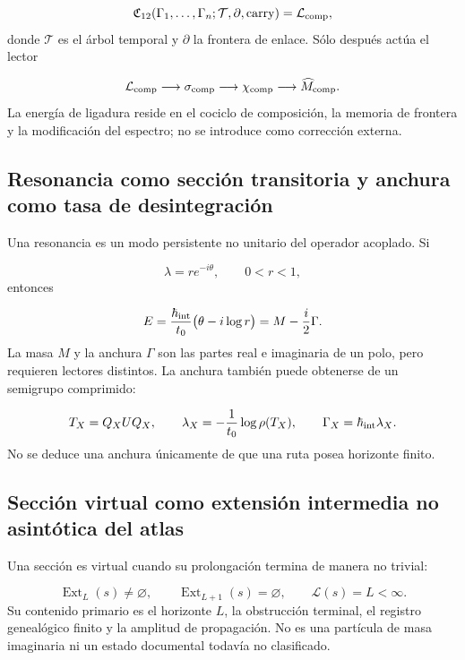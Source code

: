 \[
 \mathfrak C_{12}
 (\Gamma_1,\ldots,\Gamma_n;\mathcal T,\partial,\mathrm{carry})
 =\mathcal L_{\rm comp},
\]
donde \(\mathcal T\) es el árbol temporal y \(\partial\) la frontera de enlace. Sólo después actúa el lector

\[
 \mathcal L_{\rm comp}\longrightarrow\sigma_{\rm comp}
 \longrightarrow\chi_{\rm comp}
 \longrightarrow\widehat M_{\rm comp}.
\]
La energía de ligadura reside en el cociclo de composición, la memoria de frontera y la modificación del espectro; no se introduce como corrección externa.

\subsection{Resonancia como sección transitoria y anchura como tasa de desintegración}
Una resonancia es un modo persistente no unitario del operador acoplado. Si

\[
 \lambda=re^{-i\theta},\qquad 0<r<1,
\]
entonces

\[
 E=\frac{\hbar_{\rm int}}{t_0}
 \bigl(\theta-i\log r\bigr)
 =M-\frac{i}{2}\Gamma.
\]
La masa \(M\) y la anchura \(\Gamma\) son las partes real e imaginaria de un polo, pero requieren lectores distintos. La anchura también puede obtenerse de un semigrupo comprimido:

\[
 T_X=Q_XUQ_X,\qquad
 \lambda_X=-\frac1{t_0}\log\rho(T_X),\qquad
 \Gamma_X=\hbar_{\rm int}\lambda_X.
\]
No se deduce una anchura únicamente de que una ruta posea horizonte finito.

\subsection{Sección virtual como extensión intermedia no asintótica del atlas}
Una sección es virtual cuando su prolongación termina de manera no trivial:

\[
 \operatorname{Ext}_{L}(s)\ne\varnothing,\qquad
 \operatorname{Ext}_{L+1}(s)=\varnothing,\qquad
 \mathcal L(s)=L<\infty.
\]
Su contenido primario es el horizonte \(L\), la obstrucción terminal, el registro genealógico finito y la amplitud de propagación. No es una partícula de masa imaginaria ni un estado documental todavía no clasificado.

